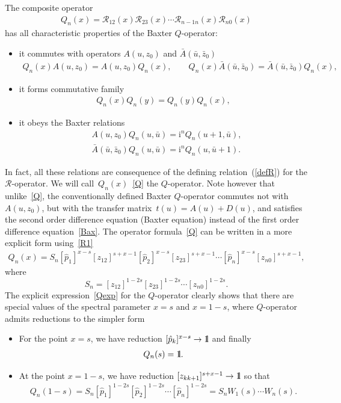 \documentclass[10pt,a4paper]{amsart}
\renewcommand{\imath}{\mathrm{i}}
\newcommand{\II}{\hbox{{1}\kern-.25em\hbox{l}}}
\numberwithin{equation}{section}
\begin{document}
The composite operator
\begin{align}\label{Q}
Q_n(x) =
\mathcal{R}_{12}(x) \mathcal{R}_{23}(x)\cdots
\mathcal{R}_{n-1 n}(x) \mathcal{R}_{n 0}(x)
\end{align}
has all characteristic properties of the Baxter $Q$-operator:
\begin{itemize}\itemsep=0pt
\item
it commutes with operators $A(u,z_0)$ and
$\bar{A}(\bar{u},\bar{z}_0)$
\begin{align}\label{comQA}
Q_n(x) A(u,z_0) = A(u,z_0) Q_n(x) ,\qquad
Q_n(x) \bar{A}(\bar{u},\bar{z}_0) =
\bar{A}(\bar{u},\bar{z}_0) Q_n(x),
\end{align}
\item it forms commutative family
\begin{align}\label{comQQ}
Q_n(x) Q_n(y) = Q_n(y) Q_n(x),
\end{align}
\item it obeys the Baxter relations
\begin{align}\label{Bax}
&A(u,z_0) Q_n(u,\bar{u}) = \imath^n Q_n(u+1,\bar{u}),
\\
\label{Baxbar}
&\bar{A}(\bar{u},\bar{z}_0) Q_n(u,\bar{u}) = \imath^n Q_n(u,\bar{u}+1).
\end{align}
\end{itemize}
In fact, all these relations are consequence of the defining
relation~(\ref{defR}) for the $\mathcal{R}$-operator.
We will call~$Q_n(x)$~\eqref{Q} the $Q$-operator.
Note however that unlike~\eqref{Q}, the conventionally defined Baxter $Q$-operator commutes not with~$A(u,z_0)$, but with the transfer matrix~$t(u)=A(u)+D(u)$,
and satisfies the second order difference equation (Baxter equation) instead of the first order difference equation~\eqref{Bax}.
The operator formula~\eqref{Q} can be written in a more explicit form using~\eqref{R1}
\begin{align}\label{Qexp}
Q_n( x) = S_n
[\hat{p}_1]^{x-s} [z_{12}]^{s+x-1}
[\hat{p}_2]^{x-s} [z_{23}]^{s+x-1}
\cdots
[\hat{p}_n]^{x-s} [z_{n0}]^{s+x-1},
\end{align}
where
\begin{equation} \label{Sn}
S_n = [z_{12}]^{1-2s} [z_{23}]^{1-2s}
\cdots [z_{n0}]^{1-2s} .
\end{equation}
The explicit expression~\eqref{Qexp} for the $Q$-operator
clearly shows that there are special values of the spectral
parameter $x=s$ and $x=1-s$, where $Q$-operator admits
reductions to the simpler form
\begin{itemize}\itemsep=0pt
\item For the point $x=s$, we have reduction $[\hat{p}_k]^{x-s} \to \II$ and finally
\begin{align*}
Q_n(s) = \II.
\end{align*}
\item
At the point $x=1-s$, we have reduction $[z_{k k+1}]^{s+x-1}\to \II$ so that
\begin{align}\label{Q_1-s}
Q_n(1-s) = S_n
[\hat{p}_1]^{1-2s}
[\hat{p}_2]^{1-2s}
\cdots
[\hat{p}_n]^{1-2s} =
S_n W_1(s) \cdots W_n(s).
\end{align}
\end{itemize}
\end{document}
